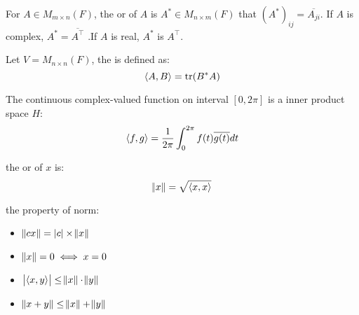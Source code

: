 \begin{definition}
	For $A \in M_{m \times n}(F)$, the  or  of $A$ is $A^* \in M_{n \times m}(F)$ that $(A^*)_{ij} = \overline{A_{ji}}$. If $A$ is complex, $A^* = \overline{A^\top}$ .If $A$ is real, $A^*$ is $A^\top$.
\end{definition}

\begin{definition}
    Let $V=M_{n \times n} (F)$, the  is defined as:
    \begin{equation}
        \left\langle \displaystyle A, B \right\rangle = \text{tr}(B^* A)
    \end{equation}
\end{definition}

\begin{definition}\label{hinnerproductspace}
	The continuous complex-valued function on interval $[0, 2\pi]$ is a inner product space $H$:
	\begin{equation}
		\left\langle \displaystyle f, g \right\rangle = \frac{1}{2\pi} \int_{0}^{2\pi} f(t) \overline{g(t)} dt
	\end{equation}
\end{definition}


\begin{definition}
	the  or  of $x$ is:
	\begin{equation}
	    \norm{x} = \sqrt{\left\langle \displaystyle x, x \right\rangle}
	\end{equation}
\end{definition}

\begin{theorem}
	the property of norm:
	\begin{itemize}
		\item $\norm{cx} = \displaystyle \left\lvert c \right\rvert \times \norm{x}$
		\item $\norm{x} = 0 \iff x = 0$
		\item {} $\displaystyle \left\lvert \left\langle \displaystyle x, y \right\rangle \right\rvert \leq \norm{x} \cdot \norm{y}$
		\item {} $\norm{x+y} \leq \norm{x} + \norm{y}$
	\end{itemize}
\end{theorem}

